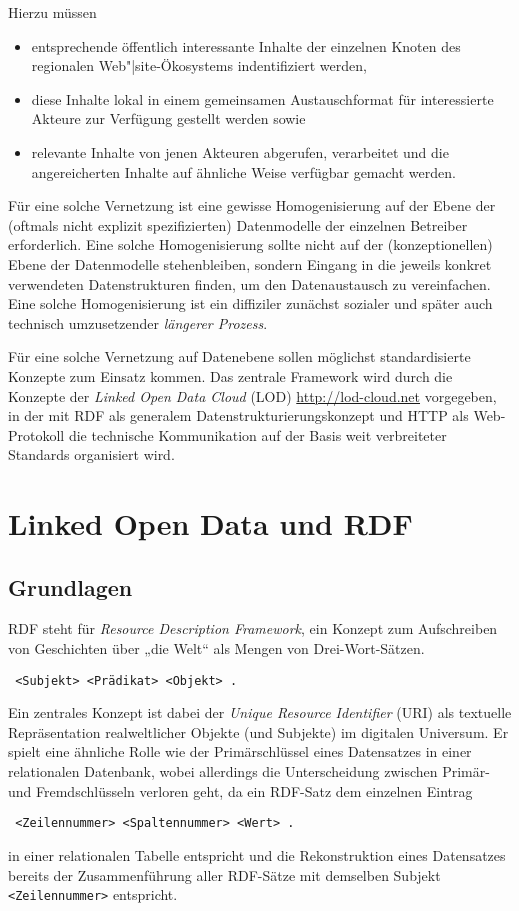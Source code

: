 \documentclass[a4paper,11pt]{article}
\begin{document}
Hierzu müssen
\begin{itemize}
\item entsprechende öffentlich interessante Inhalte der einzelnen Knoten des
  regionalen Web"|site-Ökosystems indentifiziert werden,
\item diese Inhalte lokal in einem gemeinsamen Austauschformat für
  interessierte Akteure zur Verfügung gestellt werden sowie
\item relevante Inhalte von jenen Akteuren abgerufen, verarbeitet und die
  angereicherten Inhalte auf ähnliche Weise verfügbar gemacht werden.  
\end{itemize}

Für eine solche Vernetzung ist eine gewisse Homogenisierung auf der Ebene der
(oftmals nicht explizit spezifizierten) Datenmodelle der einzelnen Betreiber
erforderlich. Eine solche Homogenisierung sollte nicht auf der
(konzeptionellen) Ebene der Datenmodelle stehenbleiben, sondern Eingang in die
jeweils konkret verwendeten Datenstrukturen finden, um den Datenaustausch zu
vereinfachen. Eine solche Homogenisierung ist ein diffiziler zunächst sozialer
und später auch technisch umzusetzender \emph{längerer Prozess}. 

Für eine solche Vernetzung auf Datenebene sollen möglichst standardisierte
Konzepte zum Einsatz kommen.  Das zentrale Framework wird durch die Konzepte
der \emph{Linked Open Data Cloud} (LOD) \url{http://lod-cloud.net} vorgegeben,
in der mit RDF als generalem Datenstrukturierungskonzept und HTTP als
Web-Protokoll die technische Kommunikation auf der Basis weit verbreiteter
Standards organisiert wird. 

\section{Linked Open Data und RDF} 

\subsection{Grundlagen} 

RDF steht für \emph{Resource Description Framework}, ein Konzept zum
Aufschreiben von Geschichten über „die Welt“ als Mengen von Drei-Wort-Sätzen.
\begin{center}\tt
  <Subjekt> <Prädikat> <Objekt> .
\end{center}
Ein zentrales Konzept ist dabei der \emph{Unique Resource Identifier} (URI) als
textuelle Repräsentation realweltlicher Objekte (und Subjekte) im digitalen
Universum.  Er spielt eine ähnliche Rolle wie der Primärschlüssel eines
Datensatzes in einer relationalen Datenbank, wobei allerdings die
Unterscheidung zwischen Primär- und Fremdschlüsseln verloren geht, da ein
RDF-Satz dem einzelnen Eintrag
\begin{center}\tt
  <Zeilennummer> <Spaltennummer> <Wert> .
\end{center}
in einer relationalen Tabelle entspricht und die Rekonstruktion eines
Datensatzes bereits der Zusammenführung aller RDF-Sätze mit demselben Subjekt
\texttt{<Zeilennummer>} entspricht.
\end{document}
